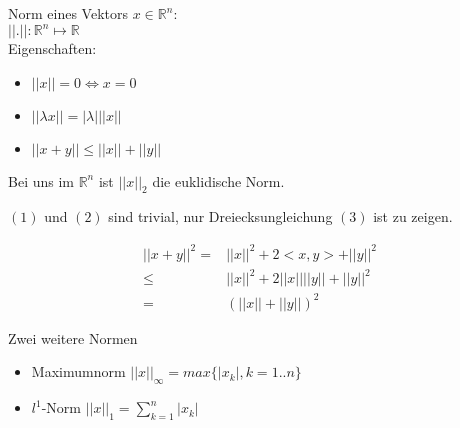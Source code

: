 \begin{definition}
	Norm eines Vektors $ x \in \mathbb{R}^n $: \\
	$ ||.||: \mathbb{R}^n \mapsto \mathbb{R} $ \\
	Eigenschaften:
	\begin{itemize}
		\item $ || x || = 0 \Leftrightarrow x = 0 $
		\item $ || \lambda x || = | \lambda | || x || $
		\item $ || x + y || \leq || x || + || y || $
	\end{itemize}
\end{definition}

Bei uns im $ \mathbb{R}^n $ ist $ || x ||_2 $ die euklidische Norm.

$(1)$ und $(2)$ sind trivial, nur Dreiecksungleichung $(3)$ ist zu zeigen.

\begin{align*}
	|| x + y ||^2 =& || x ||^2 + 2<x, y> + || y ||^2 \\
	\leq& || x ||^2 + 2 || x || || y || + || y ||^2 \\
	=& (|| x || + || y ||)^2
\end{align*}

\begin{note}
Zwei weitere Normen
	\begin{itemize}
		\item Maximumnorm $ || x ||_\infty = max \{ |x_k|, k=1..n\} $
		\item $l^1$-Norm  $ || x ||_1 = \sum_{k=1}^n |x_k|$
	\end{itemize}
\end{note}
